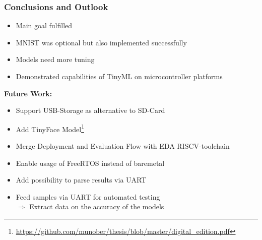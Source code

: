 \documentclass{tum-presentation}
\begin{document}
\begin{frame}
  \frametitle{Conclusions and Outlook}

  \begin{itemize}
  \item Main goal fulfilled
  \item MNIST was optional but also implemented successfully
  \item Models need more tuning
  \item Demonstrated capabilities of TinyML on microcontroller platforms
  \end{itemize}

  \pause

  \textbf{Future Work:}

\begin{itemize}
    \item Support USB-Storage as alternative to SD-Card
    \item Add TinyFace Model\footnote{\url{https://github.com/munober/thesis/blob/master/digital_edition.pdf}}
    \item Merge Deployment and Evaluation Flow with EDA RISCV-toolchain
    \item Enable usage of FreeRTOS instead of baremetal
    \item Add possibility to parse results via UART
    \item Feed samples via UART for automated testing\\[1em]
    $\Rightarrow$ Extract data on the accuracy of the models
\end{itemize}



\end{frame}
\end{document}
